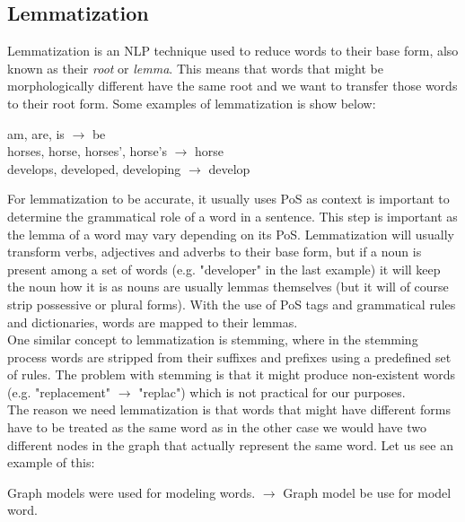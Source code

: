 \documentclass[12pt]{article}
\numberwithin{equation}{section}
\begin{document}
\begin{spacing}{1.5}
	\subsection{Lemmatization}
	Lemmatization is an NLP technique used to reduce words to their base form, also known as their \textit{root} or \textit{lemma}. This means that words that might be morphologically different have the same root and we want to transfer those words to their root form. Some examples of lemmatization is show below:
	\begin{center}
		am, are, is $\rightarrow$ be \\
		horses, horse, horses', horse's $\rightarrow$ horse \\
		develops, developed, developing $\rightarrow$ develop
	\end{center}
	For lemmatization to be accurate, it usually uses PoS as context is important to determine the grammatical role of a word in a sentence. This step is important as the lemma of a word may vary depending on its PoS. Lemmatization will usually transform verbs, adjectives and adverbs to their base form, but if a noun is present among a set of words (e.g. "developer" in the last example) it will keep the noun how it is as nouns are usually lemmas themselves (but it will of course strip possessive or plural forms). With the use of PoS tags and grammatical rules and dictionaries, words are mapped to their lemmas. \\
	One similar concept to lemmatization is stemming, where in the stemming process words are stripped from their suffixes and prefixes using a predefined set of rules. The problem with stemming is that it might produce non-existent words (e.g. "replacement" $\rightarrow$ "replac") which is not practical for our purposes. \\
	The reason we need lemmatization is that words that might have different forms have to be treated as the same word as in the other case we would have two different nodes in the graph that actually represent the same word. Let us see an example of this:
	\begin{center}
		Graph models were used for modeling words. $\rightarrow$ Graph model be use for model word.	
	\end{center}
	

\end{spacing}
\end{document}
